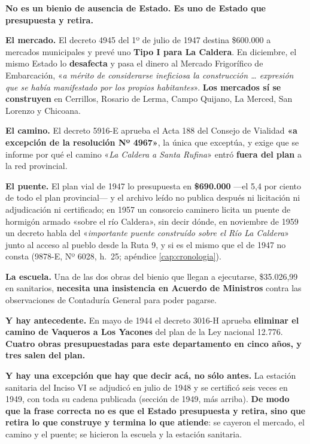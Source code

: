 \begin{cautela}
\textbf{No es un bienio de ausencia de Estado. Es uno de Estado que presupuesta y retira.}

\textbf{El mercado.} El decreto 4945 del 1º de julio de 1947 destina \$600.000 a mercados
municipales y prevé uno \textbf{Tipo I para La Caldera}. En diciembre, el mismo Estado lo
\textbf{desafecta} y pasa el dinero al Mercado Frigorífico de Embarcación, «\textit{a mérito
de considerarse ineficiosa la construcción \ldots{} expresión que se había manifestado por los
propios habitantes}». \textbf{Los mercados sí se construyen} en Cerrillos, Rosario de Lerma,
Campo Quijano, La Merced, San Lorenzo y Chicoana.

\textbf{El camino.} El decreto 5916-E aprueba el Acta 188 del Consejo de Vialidad
\textbf{«a excepción de la resolución Nº 4967»}, la única que exceptúa, y exige que se informe
por qué el camino «\textit{La Caldera a Santa Rufina}» entró \textbf{fuera del plan} a la red
provincial.

\textbf{El puente.} El plan vial de 1947 lo presupuesta en \textbf{\$690.000} ---el 5,4 por
ciento de todo el plan provincial--- y el archivo leído no publica después ni licitación ni
adjudicación ni certificado; en 1957 un consorcio caminero licita un puente de hormigón armado «sobre el río Caldera», sin decir dónde, en noviembre de 1959 un decreto habla del «\textit{importante puente construído sobre el Río La Caldera}» junto al acceso al pueblo desde la Ruta 9, y si es el mismo que el de 1947 no consta (9878-E, Nº 6028, h.\ 25; apéndice \ref{cap:cronologia}).

\textbf{La escuela.} Una de las dos obras del bienio que llegan a ejecutarse, \$35.026,99 en
sanitarios, \textbf{necesita una insistencia en Acuerdo de Ministros} contra las observaciones
de Contaduría General para poder pagarse.

\textbf{Y hay antecedente.} En mayo de 1944 el decreto 3016-H aprueba \textbf{eliminar el
camino de Vaqueros a Los Yacones} del plan de la Ley nacional 12.776. \textbf{Cuatro obras
presupuestadas para este departamento en cinco años, y tres salen del plan.}

\textbf{Y hay una excepción que hay que decir acá, no sólo antes.} La estación
sanitaria del Inciso VI se adjudicó en julio de 1948 y se certificó seis veces en 1949, con
toda su cadena publicada (sección de 1949, más arriba). \textbf{De modo que la
frase correcta no es que el Estado presupuesta y retira, sino que retira lo que construye y
termina lo que atiende}: se cayeron el mercado, el camino y el puente; se hicieron la escuela
y la estación sanitaria.
\end{cautela}

